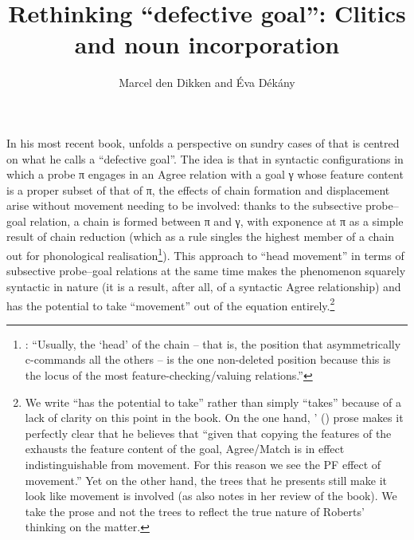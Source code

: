\documentclass[output=paper]{langsci/langscibook}
\author{Marcel den Dikken\affiliation{Eötvös University; RIL HAS} and
Éva Dékány\affiliation{RIL HAS}}
\title{Rethinking ``defective goal'': Clitics and noun incorporation}
\begin{document}
\glsresetall
\maketitle
\begin{refcontext}

In his most recent book, \cite{Roberts2010} unfolds a perspective on sundry cases
of  that is centred on what he calls a \enquote{defective goal}.
The idea is that in syntactic configurations in which a probe π engages in
an Agree relation with a goal γ whose feature content is a proper subset
of that of π, the effects of chain formation and displacement arise without
movement needing to be involved: thanks to the subsective probe--goal relation,
a chain is formed between π and γ, with exponence at π as a
simple result of chain reduction (which as a rule singles the highest member of
a chain out for phonological realisation\footnote{\citet[61]{Roberts2010}:
    \enquote{Usually, the \enquote{head} of the chain -- that is, the
        position that asymmetrically c-commands all the others -- is the one
        non-deleted position because this is the locus of the most
        feature-checking/valuing relations.}}). This approach to \enquote{head
    movement} in terms of subsective probe–goal relations at the same time
    makes the phenomenon squarely syntactic in nature (it is a result, after
    all, of a syntactic Agree relationship) and has the potential to take
    \enquote{movement} out of the equation entirely.\footnote{We write
        \enquote{has the potential to take} rather than simply
        \enquote{takes} because of a lack of clarity on this point in the
        book. On the one hand, \citeauthor{Roberts2010}'
        (\citeyear[160]{Roberts2010}) prose makes it perfectly clear that he
        believes that \enquote{given that copying the features of the
             exhausts the feature content of the goal,
        Agree/Match is in effect indistinguishable from movement. For this
    reason we see the PF effect of movement.} Yet on the other hand, the trees
    that he presents still make it look like movement is involved (as
    \citealt{matushanskyrobertsreview} also notes in her review of the book).
    We take the prose and not the trees to reflect the true nature of Roberts’
thinking on the matter.}


\end{refcontext}
\end{document}
